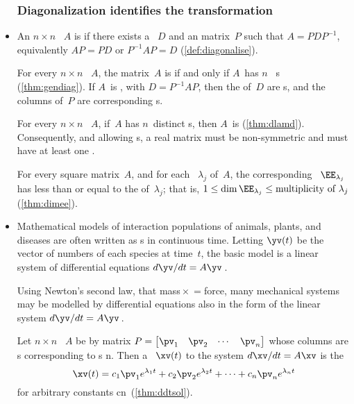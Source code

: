 \begin{itemize}
\subsubsection*{Diagonalization identifies the transformation}

\item An \(n\times n\) ~\(A\) is  if there exists a ~\(D\) and an  matrix~\(P\) such that \(A=PDP^{-1}\), equivalently \(AP=PD\) or \(P^{-1}AP=D\) (\cref{def:diagonalise}).

\itemhi For every \(n\times n\) ~\(A\), the matrix~\(A\) is  if and only if \(A\)~has \(n\)~ s (\cref{thm:gendiag}).  
If \(A\)~is , with  \(D=P^{-1}AP\), then  the  of~\(D\) are s, and the columns of~\(P\) are corresponding s.

\itemme For every \(n\times n\) ~\(A\), if~\(A\) has \(n\)~distinct s, then \(A\)~is  (\cref{thm:dlamd}).
Consequently, and allowing s, a real  matrix must be non-symmetric and must have at least one .

\itemme For every square matrix~\(A\), and for each ~\(\lambda_j\) of~\(A\), the corresponding ~\(\EE_{\lambda_j}\) has  less than or equal to the  of~\(\lambda_j\);
that is, \(1\leq\dim\EE_{\lambda_j}\leq\text{multiplicity of }\lambda_j\) (\cref{thm:dimee}).  

\item Mathematical models of interaction populations of animals, plants, and diseases are often written as s in continuous time.  Letting \(\yv(t)\) be the vector of numbers of each species at time~\(t\), the basic model is a linear system of differential equations \(d\yv/dt=A\yv\)\,. 

Using Newton's second law, that mass\({}\times{}\)\({}={}\)force, many mechanical systems may be modelled by differential equations also in the form of the linear system \(d\yv/dt=A\yv\)\,.


\itemhi Let \(n\times n\) ~\(A\) be  by matrix \(P=\begin{bmatrix} \pv_1&\pv_2&\cdots&\pv_n \end{bmatrix}\) whose columns are s corresponding to s \hlist\lambda n.  
Then a ~\(\xv(t)\) to the  system \(d\xv/dt=A\xv\) is the 
\begin{equation*}
\xv(t)=c_1\pv_1e^{\lambda_1t}+c_2\pv_2e^{\lambda_2t}+\cdots+c_n\pv_ne^{\lambda_nt}
\end{equation*}
for arbitrary constants \hlist cn\ (\cref{thm:ddtsol}).






\end{itemize}



\makeanswers
